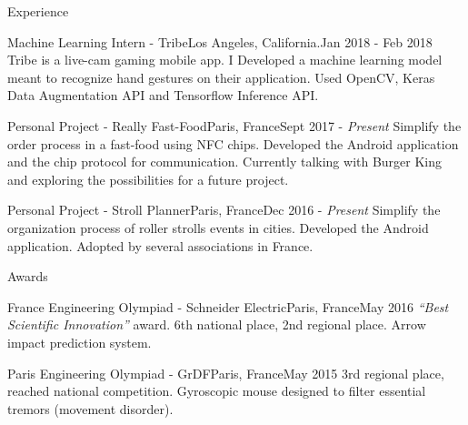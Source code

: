 \documentclass{resume} %
\begin{document}
	\begin{rSection}{Experience}
		\begin{event}{Machine Learning Intern - Tribe}{Los Angeles, California.}{Jan 2018 - Feb 2018}{
			Tribe is a live-cam gaming mobile app. I Developed a machine learning model meant to recognize hand gestures on their application. Used OpenCV, Keras Data Augmentation API and Tensorflow Inference API. 
		}
		\end{event}
		
		
		
		\begin{event}{Personal Project - Really Fast-Food}{Paris, France}{Sept 2017 - \em Present}{
			Simplify the order process in a fast-food using NFC chips. Developed the Android application and the chip protocol for communication. Currently talking with Burger King and exploring the possibilities for a future project. 
		}
		\end{event}
		
		
		
		\begin{event}{Personal Project - Stroll Planner}{Paris, France}{Dec 2016 - \em Present}{
			Simplify the organization process of roller strolls events in cities. Developed the Android application. Adopted by several associations in France. 
		}
		\end{event}
	\end{rSection}
	
	
	
	\begin{rSection}{Awards} \itemsep -2pt
		\begin{event}{France Engineering Olympiad - Schneider Electric}{Paris, France}{May 2016}{
				{\em \textquotedblleft Best Scientific Innovation\textquotedblright} award. 6th national place, 2nd regional place. Arrow impact prediction system. 
			}
		\end{event}
		
		\begin{event}{Paris Engineering Olympiad - GrDF}{Paris, France}{May 2015}{
				3rd regional place, reached national competition. Gyroscopic mouse designed to filter essential tremors (movement disorder). 
			}
		\end{event}
	\end{rSection}
	
\end{document}

